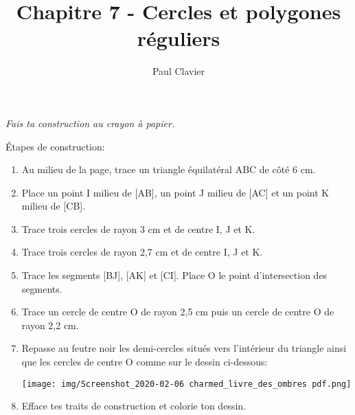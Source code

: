 \documentclass[12pt,a4paper]{article}
\author{Paul Clavier}
\title{Chapitre 7 - Cercles et polygones réguliers}
\begin{document}
\renewcommand\thesection{\Roman{section}}
\renewcommand\thesubsection{\arabic{subsection}}


\ifdefined\isprof
	\TeacherModeOn
\fi




\begin{center}
\end{center}

\textit{Fais ta construction au crayon à papier.}

Étapes de construction:

\begin{enumerate}
\item Au milieu de la page, trace un triangle équilatéral ABC de côté 6 cm.
\item Place un point I milieu de [AB], un point J milieu de [AC] et un point K milieu de [CB].
\item Trace trois cercles de rayon 3 cm et de centre I, J et K.
\item Trace trois cercles de rayon 2,7 cm et de centre I, J et K.
\item Trace les segments [BJ], [AK] et [CI]. Place O le point d’intersection des segments.
\item Trace un cercle de centre O de rayon 2,5 cm puis un cercle de centre O de rayon 2,2 cm.
\item Repasse au feutre noir les demi-cercles situés vers l'intérieur du triangle ainsi que les cercles de centre O comme sur le dessin ci-dessous:
\begin{center}
\texttt{[image: img/Screenshot\_2020-02-06 charmed\_livre\_des\_ombres pdf.png]}
\end{center}

\item Efface tes traits de construction et colorie ton dessin.

\end{enumerate}
\end{document}
